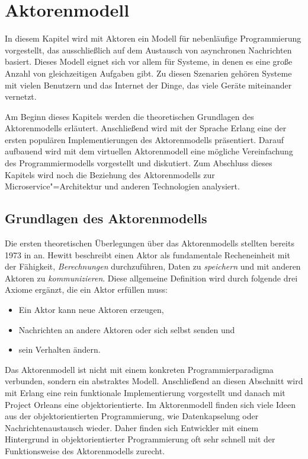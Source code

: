 \chapter{Aktorenmodell}
\label{chap:actormodel}

In diesem Kapitel wird mit Aktoren ein Modell für nebenläufige Programmierung vorgestellt, das ausschließlich auf dem Austausch von asynchronen Nachrichten basiert. Dieses Modell eignet sich vor allem für Systeme, in denen es eine große Anzahl von gleichzeitigen Aufgaben gibt. Zu diesen Szenarien gehören Systeme mit vielen Benutzern und das Internet der Dinge, das viele  Geräte miteinander vernetzt.

Am Beginn dieses Kapitels werden die theoretischen Grundlagen des Aktorenmodells erläutert. Anschließend wird mit der Sprache Erlang eine der ersten populären Implementierungen des Aktorenmodells präsentiert. Darauf aufbauend wird mit dem virtuellen Aktorenmodell eine mögliche Vereinfachung des Programmiermodells vorgestellt und diskutiert. Zum Abschluss dieses Kapitels wird noch die Beziehung des Aktorenmodells zur Microservice"=Architektur und anderen Technologien analysiert.

\section{Grundlagen des Aktorenmodells}
\label{sec:actor-model}

Die ersten theoretischen Überlegungen über das Aktorenmodells stellten \citeauthor{Hewitt:1973:UMA:1624775.1624804} bereits 1973 in \cite{Hewitt:1973:UMA:1624775.1624804} an. Hewitt beschreibt einen Aktor als fundamentale Recheneinheit mit der Fähigkeit, \textit{Berechnungen} durchzuführen, Daten zu \textit{speichern} und mit anderen Aktoren zu \textit{kommunizieren}. Diese allgemeine Definition wird durch folgende drei Axiome ergänzt, die ein Aktor erfüllen muss:

\begin{itemize}
	\item Ein Aktor kann neue Aktoren erzeugen,
	\item Nachrichten an andere Aktoren oder sich selbst senden und
	\item sein Verhalten ändern.
\end{itemize}

\noindent
Das Aktorenmodell ist nicht mit einem konkreten Programmierparadigma verbunden, sondern ein abstraktes Modell. Anschließend an diesen Abschnitt wird mit Erlang eine rein funktionale Implementierung vorgestellt und danach mit Project Orleans eine objektorientierte. Im Aktorenmodell finden sich viele Ideen aus der objektorientierten Programmierung, wie \zB Datenkapselung oder Nachrichtenaustausch wieder. Daher finden sich Entwickler mit einem Hintergrund in objektorientierter Programmierung oft sehr schnell mit der Funktionsweise des Aktorenmodells zurecht.

